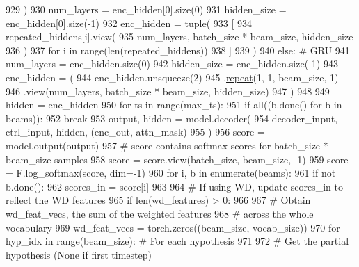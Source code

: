 \begin{DoxyCode}
929                 )
930             num\_layers = enc\_hidden[0].size(0)
931             hidden\_size = enc\_hidden[0].size(-1)
932             enc\_hidden = tuple(
933                 [
934                     repeated\_hiddens[i].view(
935                         num\_layers, batch\_size * beam\_size, hidden\_size
936                     )
937                     \textcolor{keywordflow}{for} i \textcolor{keywordflow}{in} range(len(repeated\_hiddens))
938                 ]
939             )
940         \textcolor{keywordflow}{else}:  \textcolor{comment}{# GRU}
941             num\_layers = enc\_hidden.size(0)
942             hidden\_size = enc\_hidden.size(-1)
943             enc\_hidden = (
944                 enc\_hidden.unsqueeze(2)
945                 .\hyperlink{namespacerepeat}{repeat}(1, 1, beam\_size, 1)
946                 .view(num\_layers, batch\_size * beam\_size, hidden\_size)
947             )
948 
949         hidden = enc\_hidden
950         \textcolor{keywordflow}{for} ts \textcolor{keywordflow}{in} range(max\_ts):
951             \textcolor{keywordflow}{if} all((b.done() \textcolor{keywordflow}{for} b \textcolor{keywordflow}{in} beams)):
952                 \textcolor{keywordflow}{break}
953             output, hidden = model.decoder(
954                 decoder\_input, ctrl\_input, hidden, (enc\_out, attn\_mask)
955             )
956             score = model.output(output)
957             \textcolor{comment}{# score contains softmax scores for batch\_size * beam\_size samples}
958             score = score.view(batch\_size, beam\_size, -1)
959             score = F.log\_softmax(score, dim=-1)
960             \textcolor{keywordflow}{for} i, b \textcolor{keywordflow}{in} enumerate(beams):
961                 \textcolor{keywordflow}{if} \textcolor{keywordflow}{not} b.done():
962                     scores\_in = score[i]
963 
964                     \textcolor{comment}{# If using WD, update scores\_in to reflect the WD features}
965                     \textcolor{keywordflow}{if} len(wd\_features) > 0:
966 
967                         \textcolor{comment}{# Obtain wd\_feat\_vecs, the sum of the weighted features}
968                         \textcolor{comment}{# across the whole vocabulary}
969                         wd\_feat\_vecs = torch.zeros((beam\_size, vocab\_size))
970                         \textcolor{keywordflow}{for} hyp\_idx \textcolor{keywordflow}{in} range(beam\_size):  \textcolor{comment}{# For each hypothesis}
971 
972                             \textcolor{comment}{# Get the partial hypothesis (None if first timestep)}

\end{DoxyCode}

